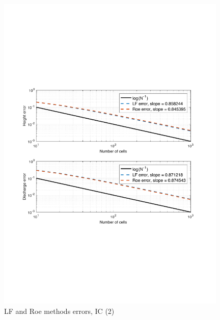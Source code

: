 \documentclass[11pt,a4paper]{article}
\begin{document}
\begin{figure}[!htb]
    \centering
    \includegraphics[width=11cm]{pictures/IC_1_error.pdf}
    \caption{LF and Roe methods errors, IC (2)}
    \label{fig:IC_1_errors}
\end{figure}
\end{document}
